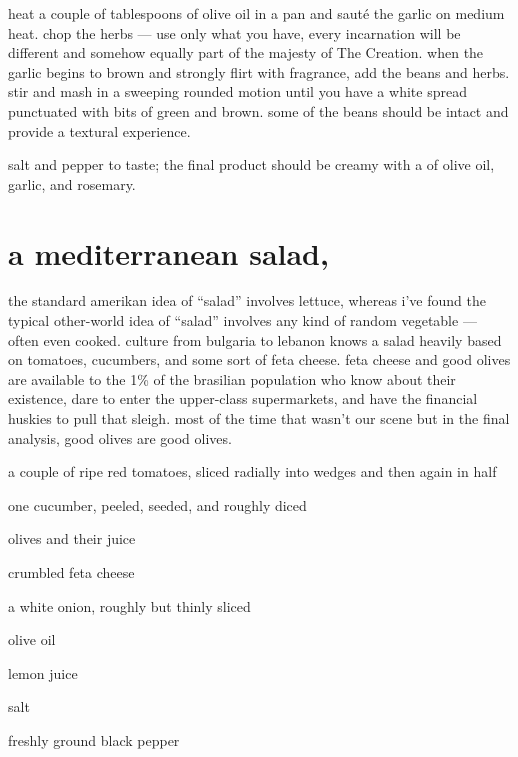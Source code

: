 heat a couple of tablespoons of olive oil in a pan and saut\'{e} the
garlic on medium heat. chop the herbs --- use only what you have,
every incarnation will be different and somehow equally part of the
majesty of The Creation. when the garlic begins to brown and strongly
flirt with fragrance, add the beans and herbs. stir and mash in a
sweeping rounded motion until you have a white spread punctuated with
bits of green and brown. some of the beans should be intact and
provide a textural experience.

salt and pepper to taste; the final product should be creamy with a
 of olive oil, garlic, and rosemary.

\section{a mediterranean salad, }

the standard amerikan idea of ``salad'' involves lettuce, whereas
i've found the typical other-world idea of ``salad'' involves
any kind of random vegetable --- often even cooked. culture from
bulgaria to lebanon knows a salad heavily based on tomatoes,
cucumbers, and some sort of feta cheese. feta cheese and good olives
are available to the 1\% of the brasilian population who know about
their existence, dare to enter the upper-class supermarkets, and have
the financial huskies to pull that sleigh. most of the time that
wasn't our scene but in the final analysis, good olives are good
olives.

\begin{ingredients}
  \item a couple of ripe red tomatoes, sliced radially into wedges and
  then again in half

  \item one cucumber, peeled, seeded, and roughly diced

  \item olives and their juice

  \item crumbled feta cheese

  \item \onehalf a white onion, roughly but thinly sliced

  \item olive oil

  \item lemon juice

  \item salt

  \item freshly ground black pepper
\end{ingredients}

